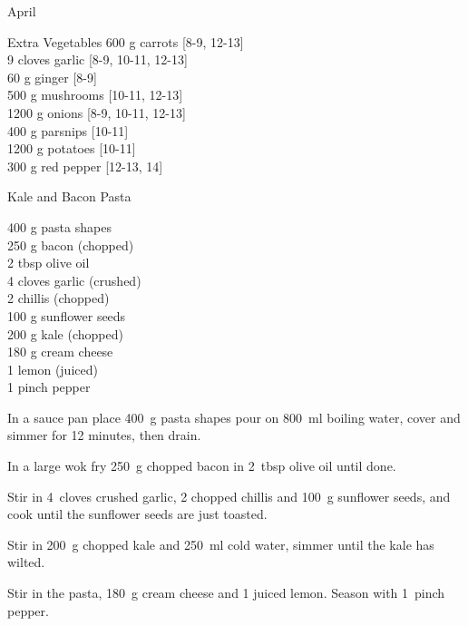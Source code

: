 \begin{menu}{April}
      \begin{shoppinglist}{Extra Vegetables}
      600 g carrots {\scriptsize[8-9, 12-13]}\\
      9 cloves garlic {\scriptsize[8-9, 10-11, 12-13]}\\
      60 g ginger {\scriptsize[8-9]}\\
      500 g mushrooms {\scriptsize[10-11, 12-13]}\\
      1200 g onions {\scriptsize[8-9, 10-11, 12-13]}\\
      400 g parsnips {\scriptsize[10-11]}\\
      1200 g potatoes {\scriptsize[10-11]}\\
      300 g red pepper {\scriptsize[12-13, 14]}\\
      \end{shoppinglist}%
      \par\vfil %
    \vfil\clearpage
  
    \begin{recipe}{2}{Kale and Bacon Pasta}%
		\begin{ingredients}
		400 g pasta shapes  \\
	250 g bacon (chopped) \\
	2 tbsp olive oil  \\
	4 cloves garlic (crushed) \\
	2  chillis (chopped) \\
	100 g sunflower seeds  \\
	200 g kale (chopped) \\
	180 g cream cheese  \\
	1  lemon (juiced) \\
	1 pinch pepper  \\
	
		\end{ingredients}
	
	
    \begin{instructions}
    \item 
    In a
    sauce pan
    place
    400~g  pasta shapes
    pour on
    800~ml  boiling water,
    cover and simmer for 12 minutes, then drain.
  \item 
        In a large wok fry
        250~g chopped bacon
        in
        2~tbsp  olive oil
        until done.
      \item 
        Stir in
        4~cloves crushed garlic,
        2 chopped chillis
        and
        100~g  sunflower seeds,
        and cook until the sunflower seeds are just toasted.
      \item 
        Stir in
        200~g chopped kale
        and
        250~ml  cold water,
        simmer until the kale has wilted.
      \item 
        Stir in the pasta,
        180~g  cream cheese
        and
        1 juiced lemon.
        Season with
        1~pinch  pepper.
      

\end{instructions}
\end{recipe}
\end{menu}
